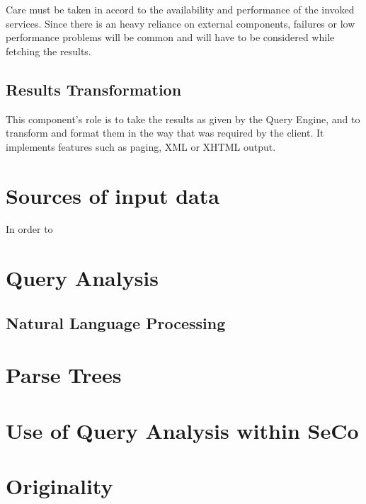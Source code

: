Care must be taken in accord to the availability and performance of the invoked services. Since there is an heavy reliance on external components, failures or low performance problems will be common and will have to be considered while fetching the results.

\subsection{Results Transformation} %
\label{sub:results_transformation}
This component's role is to take the results as given by the Query Engine, and to transform and format them in the way that was required by the client. It implements features such as paging, XML or XHTML output.


\section{Sources of input data} %
\label{sec:sources_of_input_data}

In order to 

\section{Query Analysis} %
\label{sec:query_analysis}

\subsection{Natural Language Processing} %
\label{sub:natural_language_processing}


\section{Parse Trees} %
\label{sec:parse_trees}



\section{Use of Query Analysis within SeCo} %
\label{sec:use_of_query_analysis_within_seco}


\section{Originality} %
\label{sec:originality}


